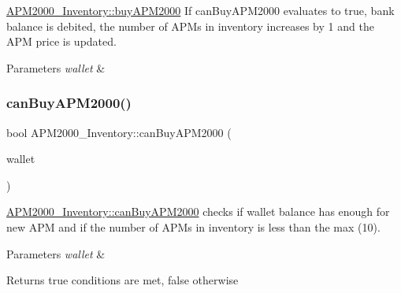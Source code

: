 \hyperlink{classAPM2000__Inventory_a5f89890fced248efa0792e0ac062e9e2}{A\+P\+M2000\+\_\+\+Inventory\+::buy\+A\+P\+M2000} If can\+Buy\+A\+P\+M2000 evaluates to true, bank balance is debited, the number of A\+P\+Ms in inventory increases by 1 and the A\+PM price is updated. 


\begin{DoxyParams}{Parameters}
{\em wallet} & \\
\hline
\end{DoxyParams}
\mbox{\label{classAPM2000__Inventory_a8edb69c3a8614e7b709605f59a3c409b}} 
\subsubsection{\texorpdfstring{can\+Buy\+A\+P\+M2000()}{canBuyAPM2000()}}
{\footnotesize\ttfamily bool A\+P\+M2000\+\_\+\+Inventory\+::can\+Buy\+A\+P\+M2000 (\begin{DoxyParamCaption}\item[{\hyperlink{classWallet}{Wallet} \&}]{wallet }\end{DoxyParamCaption})}



\hyperlink{classAPM2000__Inventory_a8edb69c3a8614e7b709605f59a3c409b}{A\+P\+M2000\+\_\+\+Inventory\+::can\+Buy\+A\+P\+M2000} checks if wallet balance has enough for new A\+PM and if the number of A\+P\+Ms in inventory is less than the max (10). 


\begin{DoxyParams}{Parameters}
{\em wallet} & \\
\hline
\end{DoxyParams}
\begin{DoxyReturn}{Returns}
true conditions are met, false otherwise 
\end{DoxyReturn}
\mbox{\label{classAPM2000__Inventory_a57eae269c4c67d3133175d6006373d2b}} 
